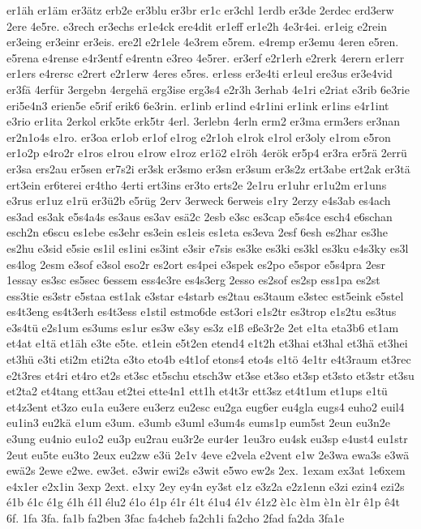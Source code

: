 {er1äh
er1äm
er3ätz
erb2e
er3blu
er3br
er1c
er3chl
1erdb
er3de
2erdec
erd3erw
2ere
4e5re.
e3rech
er3echs
er1e4ck
ere4dit
er1eff
er1e2h
4e3r4ei.
er1eig
e2rein
er3eing
er3einr
er3eis.
ere2l
e2r1ele
4e3rem
e5rem.
e4remp
er3emu
4eren
e5ren.
e5rena
e4rense
e4r3entf
e4rentn
e3reo
4e5rer.
er3erf
e2r1erh
e2rerk
4erern
er1err
er1ers
e4rersc
e2rert
e2r1erw
4eres
e5res.
er1ess
er3e4ti
er1eul
ere3us
er3e4vid
er3fä
4erfür
3ergebn
4ergehä
erg3ise
erg3s4
e2r3h
3erhab
4e1ri
e2riat
e3rib
6e3rie
eri5e4n3
erien5e
e5rif
erik6
6e3rin.
er1inb
er1ind
e4r1ini
er1ink
er1ins
e4r1int
e3rio
er1ita
2erkol
erk5te
erk5tr
4erl.
3erlebn
4erln
erm2
er3ma
erm3ers
er3nan
er2n1o4s
e1ro.
er3oa
er1ob
er1of
e1rog
e2r1oh
e1rok
e1rol
er3oly
e1rom
e5ron
er1o2p
e4ro2r
e1ros
e1rou
e1row
e1roz
er1ö2
e1röh
4erök
er5p4
er3ra
er5rä
2errü
er3sa
ers2au
er5sen
er7s2i
er3sk
er3smo
er3sn
er3sum
er3s2z
ert3abe
ert2ak
er3tä
ert3ein
er6terei
er4tho
4erti
ert3ins
er3to
erts2e
2e1ru
er1uhr
er1u2m
er1uns
e3rus
er1uz
e1rü
er3ü2b
e5rüg
2erv
3erweck
6erweis
e1ry
2erzy
e4s3ab
es4ach
es3ad
es3ak
e5s4a4s
es3aus
es3av
esä2c
2esb
e3sc
es3cap
e5s4ce
esch4
e6schan
esch2n
e6scu
es1ebe
es3ehr
es3ein
es1eis
es1eta
es3eva
2esf
6esh
es2har
es3he
es2hu
e3sid
e5sie
es1il
es1ini
es3int
e3sir
e7sis
es3ke
es3ki
es3kl
es3ku
e4s3ky
es3l
es4log
2esm
e3sof
e3sol
eso2r
es2ort
es4pei
e3spek
es2po
e5spor
e5s4pra
2esr
1essay
es3sc
es5sec
6essem
ess4e3re
es4s3erg
2esso
es2sof
es2sp
ess1pa
es2st
ess3tie
es3str
e5staa
est1ak
e3star
e4starb
es2tau
es3taum
e3stec
est5eink
e5stel
es4t3eng
es4t3erh
es4t3ess
e1stil
estmo6de
est3ori
e1s2tr
es3trop
e1s2tu
es3tus
e3s4tü
e2s1um
es3ums
es1ur
es3w
e3sy
es3z
e1ß
eße3r2e
2et
e1ta
eta3b6
et1am
et4at
e1tä
et1äh
e3te
e5te.
et1ein
e5t2en
etend4
e1t2h
et3hai
et3hal
et3hä
et3hei
et3hü
e3ti
eti2m
eti2ta
e3to
eto4b
e4t1of
etons4
eto4s
e1tö
4e1tr
e4t3raum
et3rec
e2t3res
et4ri
et4ro
et2s
et3sc
et5schu
etsch3w
et3se
et3so
et3sp
et3sto
et3str
et3su
et2ta2
et4tang
ett3au
et2tei
ette4n1
ett1h
et4t3r
ett3sz
et4t1um
et1ups
e1tü
et4z3ent
et3zo
eu1a
eu3ere
eu3erz
eu2esc
eu2ga
eug6er
eu4gla
eugs4
euho2
euil4
eu1in3
eu2kä
e1um
e3um.
e3umb
e3uml
e3um4s
eums1p
eum5st
2eun
eu3n2e
e3ung
eu4nio
eu1o2
eu3p
eu2rau
eu3r2e
eur4er
1eu3ro
eu4sk
eu3sp
e4ust4
eu1str
2eut
eu5te
eu3to
2eux
eu2zw
e3ü
2e1v
4eve
e2vela
e2vent
e1w
2e3wa
ewa3s
e3wä
ewä2s
2ewe
e2we.
ew3et.
e3wir
ewi2s
e3wit
e5wo
ew2s
2ex.
1exam
ex3at
1e6xem
e4x1er
e2x1in
3exp
2ext.
e1xy
2ey
ey4n
ey3st
e1z
e3z2a
e2z1enn
e3zi
ezin4
ezi2s
é1b
é1c
é1g
é1h
é1l
élu2
é1o
é1p
é1r
é1t
é1u4
é1v
é1z2
è1c
è1m
è1n
è1r
ê1p
ê4t
6f.
1fa
3fa.
fa1b
fa2ben
3fac
fa4cheb
fa2ch1i
fa2cho
2fad
fa2da
3fa1e
}
